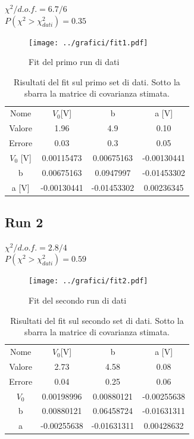 \documentclass[a4paper,10pt]{article}
\begin{document}
$\chi^2/d.o.f.=6.7/6$ \\
$P(\chi^2>\chi^2_{dati})=0.35$\\ 

\begin{figure}[H]
	\centering
	\texttt{[image: ../grafici/fit1.pdf]}
	\caption{Fit del primo run di dati}
	\label{fig:RUN1}
\end{figure}

\begin{table}[H]
	\centering
	\begin{tabular}{cccc}
	Nome	&	$ V_0 $[V] &  b          & a [V]\\
	Valore  & 1.96   & 4.9  & 0.10\\ 
	Errore  & 0.03 & 0.3 & 0.05\\
	\hline
	$V_0$ [V] & 0.00115473  & 0.00675163  & -0.00130441\\
	b  	    & 0.00675163  & 0.0947997   & -0.01453302\\
	a [V]   & -0.00130441 & -0.01453302 & 0.00236345\\
\end{tabular}
\caption{Risultati del fit sul primo set di dati. Sotto la sbarra la matrice di covarianza stimata.}
\label{tab:Run1}
\end{table}

\subsection{Run 2}

$\chi^2/d.o.f.= 2.8/4$ \\
$P(\chi^2>\chi^2_{dati})= 0.59$\\
 
\begin{figure}[H]
	\centering
	\texttt{[image: ../grafici/fit2.pdf]}
	\caption{Fit del secondo run di dati}
	\label{fig:RUN2}
\end{figure} 

\begin{table}[H]
	\centering
	\begin{tabular}{cccc}
	Nome	&	$ V_0 $[V] &  b      & a [V]\\
	Valore  &   2.73 & 4.58  & 0.08\\
	Errore	& 0.04   & 0.25  & 0.06\\ 
\hline 
	$V_0$ & 0.00198996 & 0.00880121  &-0.00255638\\
 	b     & 0.00880121 & 0.06458724  &-0.01631311\\
 	a     &-0.00255638 & -0.01631311 & 0.00428632\\
\end{tabular}
\caption{Risultati del fit sul secondo set di dati. Sotto la sbarra la matrice di covarianza stimata.}
\label{tab:Run2}
\end{table}
\end{document}
